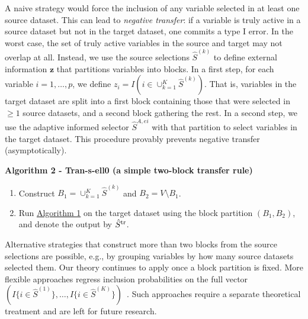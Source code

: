 \documentclass[
  12pt]{article}
\providecommand{\tightlist}{%
  \setlength{\itemsep}{0pt}\setlength{\parskip}{0pt}}\usepackage{longtable,booktabs,array}
\newcommand{\bz}{\boldsymbol{z}}
\begin{document}
A naive strategy would force the inclusion of any variable selected in at least one source dataset.
This can lead to \emph{negative transfer}: if a variable is truly active in a source dataset but not in the target dataset, one commits a type I error.
In the worst case, the set of truly active variables in the source and target may not overlap at all.
Instead, we use the source selections $\hat{S}^{(k)}$ to define  external information $\bz$ that partitions variables into blocks. In a first step, for each variable $i=1,\ldots,p$, we define $z_i= I (i\in \cup_{k=1}^K\hat{S}^{(k)})$. 
That is, variables in the target dataset are split into a first block containing those that were selected in $\geq 1$ source datasets, and a second block gathering the rest.
In a second step, we use the adaptive informed selector $\hat{S}^{A,ei}$ with that partition to select variables in the target dataset. This procedure provably prevents negative transfer (asymptotically).

\textbf{\hypertarget{lab:AlgoTL}{Algorithm 2} - Tran-s-ell0 (a simple two-block transfer rule)}
\begin{enumerate}[label=(\roman*)]\tightlist
    \item Construct $B_1= \cup_{k=1}^K\hat{S}^{(k)}$ and $B_2=V\setminus B_1$.
    \item Run \hyperlink{lab:AlgoAIS}{Algorithm 1} on the target dataset using the block partition $(B_1,B_2)$, and denote the output by $\hat{S}^{\rm tr}$.
\end{enumerate}

Alternative strategies that construct more than two blocks from the source selections are possible, e.g., by grouping variables by how many source datasets selected them. Our theory continues to apply once a block partition is fixed.
More flexible approaches regress inclusion probabilities on the full vector $(I\{i\in \hat S^{(1)}\},\ldots,I\{i\in \hat S^{(K)}\})$~\citep{vandeWiel2019}. Such approaches require a separate theoretical treatment and are left for future research.
\end{document}
